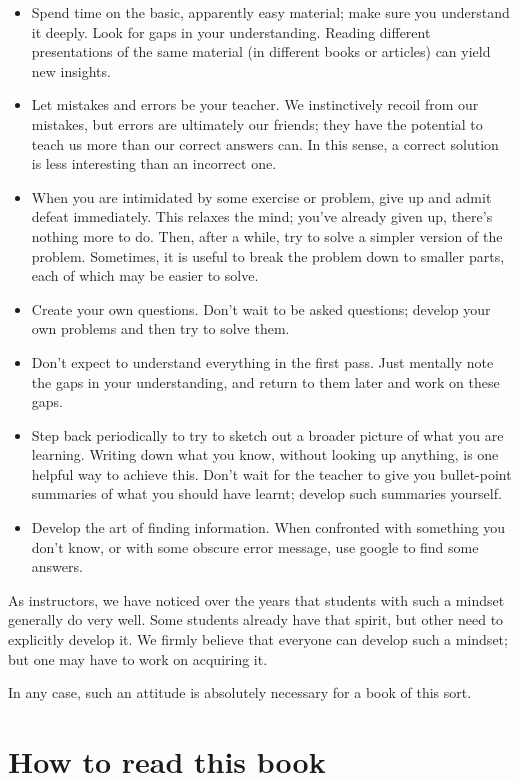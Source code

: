 \documentclass[12pt,]{krantz}
\providecommand{\tightlist}{%
  \setlength{\itemsep}{0pt}\setlength{\parskip}{0pt}}
\theoremstyle{definition}
\theoremstyle{definition}
\theoremstyle{definition}
\theoremstyle{remark}
\begin{document}
\begin{itemize}
\tightlist
\item
  Spend time on the basic, apparently easy material; make sure you
  understand it deeply. Look for gaps in your understanding. Reading
  different presentations of the same material (in different books or
  articles) can yield new insights.
\item
  Let mistakes and errors be your teacher. We instinctively recoil from
  our mistakes, but errors are ultimately our friends; they have the
  potential to teach us more than our correct answers can. In this
  sense, a correct solution is less interesting than an incorrect one.
\item
  When you are intimidated by some exercise or problem, give up and
  admit defeat immediately. This relaxes the mind; you've already given
  up, there's nothing more to do. Then, after a while, try to solve a
  simpler version of the problem. Sometimes, it is useful to break the
  problem down to smaller parts, each of which may be easier to solve.
\item
  Create your own questions. Don't wait to be asked questions; develop
  your own problems and then try to solve them.
\item
  Don't expect to understand everything in the first pass. Just mentally
  note the gaps in your understanding, and return to them later and work
  on these gaps.
\item
  Step back periodically to try to sketch out a broader picture of what
  you are learning. Writing down what you know, without looking up
  anything, is one helpful way to achieve this. Don't wait for the
  teacher to give you bullet-point summaries of what you should have
  learnt; develop such summaries yourself.
\item
  Develop the art of finding information. When confronted with something
  you don't know, or with some obscure error message, use google to find
  some answers.
\end{itemize}

As instructors, we have noticed over the years that students with such a
mindset generally do very well. Some students already have that spirit,
but other need to explicitly develop it. We firmly believe that everyone
can develop such a mindset; but one may have to work on acquiring it.

In any case, such an attitude is absolutely necessary for a book of this
sort.

\section{How to read this book}\label{how-to-read-this-book}
\end{document}
